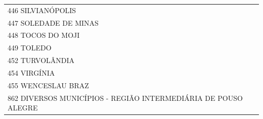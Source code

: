 \documentclass{article}
\begin{document}
\begin{longtable}[c]{m{18cm}}
\multicolumn{1}{l}{ \hspace{2em} 446 SILVIANÓPOLIS } \\
\multicolumn{1}{l}{ \hspace{2em} 447 SOLEDADE DE MINAS } \\
\multicolumn{1}{l}{ \hspace{2em} 448 TOCOS DO MOJI } \\
\multicolumn{1}{l}{ \hspace{2em} 449 TOLEDO } \\
\multicolumn{1}{l}{ \hspace{2em} 452 TURVOLÂNDIA } \\
\multicolumn{1}{l}{ \hspace{2em} 454 VIRGÍNIA } \\
\multicolumn{1}{l}{ \hspace{2em} 455 WENCESLAU BRAZ } \\
\multicolumn{1}{l}{ \hspace{2em} 862 DIVERSOS MUNICÍPIOS - REGIÃO INTERMEDIÁRIA DE POUSO ALEGRE } \\
\end{longtable}
\newpage
\end{document}
